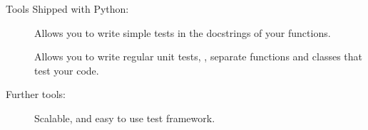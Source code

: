 \begin{frame}{Tools}
  Shipped with Python:
  \begin{description}
    \item [] Allows you to write simple tests in the docstrings
      of your functions.
    \item [] Allows you to write regular unit tests,
      \ie, separate functions and classes that test your code.
  \end{description}
  \vspace{0.5cm}
  Further tools:
  \begin{description}
    \item [] Scalable, and easy to use test framework.
  \end{description}
\end{frame}
